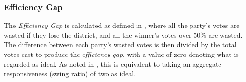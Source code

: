             \subsubsection*{Efficiency Gap}
    The \textit{Efficiency Gap} is calculated as defined in \citet{Stephanopoulos2014_UofChicagoLaw}, where all the party’s votes are wasted if they lose the district, and all the winner’s votes over 50\% are wasted. The difference between each party’s wasted votes is then divided by the total votes cast to produce the \textit{efficiency gap}, with a value of zero denoting what is regarded as ideal. As noted in \citet[][p. 13]{Best2018}, this is equivalent to taking an aggregate responsiveness (swing ratio) of two as ideal. 
\par
